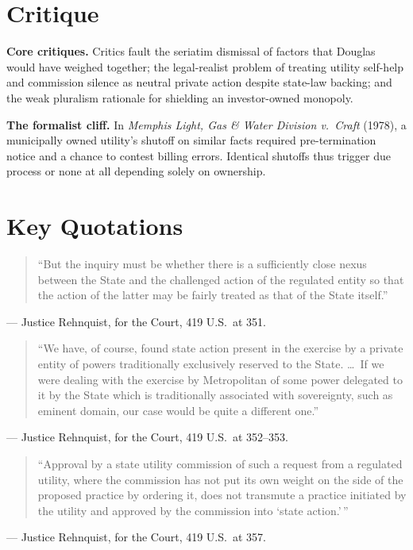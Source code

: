 \documentclass[12pt]{article}
\begin{document}
\section{Critique}

\textbf{Core critiques.} Critics fault the seriatim dismissal of factors that Douglas would have weighed together; the legal-realist problem of treating utility self-help and commission silence as neutral private action despite state-law backing; and the weak pluralism rationale for shielding an investor-owned monopoly.

\textbf{The formalist cliff.} In \textit{Memphis Light, Gas \& Water Division v.\ Craft} (1978), a municipally owned utility's shutoff on similar facts required pre-termination notice and a chance to contest billing errors. Identical shutoffs thus trigger due process or none at all depending solely on ownership.

\section{Key Quotations}

\begin{quote}
``But the inquiry must be whether there is a sufficiently close nexus between the State and the challenged action of the regulated entity so that the action of the latter may be fairly treated as that of the State itself.''
\end{quote}
\noindent --- Justice Rehnquist, for the Court, 419 U.S.\ at 351.

\begin{quote}
``We have, of course, found state action present in the exercise by a private entity of powers traditionally exclusively reserved to the State. \dots\ If we were dealing with the exercise by Metropolitan of some power delegated to it by the State which is traditionally associated with sovereignty, such as eminent domain, our case would be quite a different one.''
\end{quote}
\noindent --- Justice Rehnquist, for the Court, 419 U.S.\ at 352--353.

\begin{quote}
``Approval by a state utility commission of such a request from a regulated utility, where the commission has not put its own weight on the side of the proposed practice by ordering it, does not transmute a practice initiated by the utility and approved by the commission into `state action.'\,''
\end{quote}
\noindent --- Justice Rehnquist, for the Court, 419 U.S.\ at 357.
\end{document}
